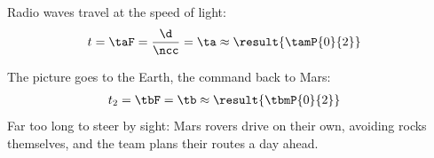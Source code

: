 \begin{abcliste}
\abc Radio waves travel at the speed of light:
\begin{align}
 t &= \taF = \frac{\d}{\ncc} = \ta \approx \result{\tamP{0}{2}}
\end{align}

\abc The picture goes to the Earth, the command back to Mars:
\begin{align}
 t_2 &= \tbF = \tb \approx \result{\tbmP{0}{2}}
\end{align}
Far too long to steer by sight: Mars rovers drive on their own, avoiding rocks themselves, and the team plans their routes a day ahead.
\end{abcliste}
